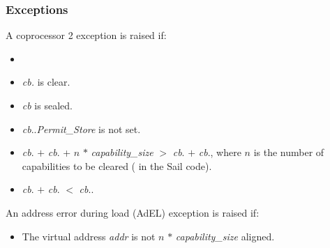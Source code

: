 
\subsubsection*{Exceptions}

A coprocessor 2 exception is raised if:

\begin{itemize}
\item
\cchecktag{}
\item
\emph{cb.\ctag{}} is clear.
\item
\emph{cb} is sealed.
\item
\emph{cb}.\cperms.\emph{Permit\_Store} is not set.
\item
\emph{cb}.\cbase{} $+$ \emph{cb}.\coffset{} + $n$ $*$ \emph{capability\_size} $>$ \emph{cb}.\cbase{} $+$ \emph{cb}.\clength{},
		where $n$ is the number of capabilities to be cleared ( in the Sail code).
\item
\emph{cb}.\cbase{} $+$ \emph{cb}.\coffset{} $<$ \emph{cb}.\cbase{}.
\end{itemize}

An address error during load (AdEL) exception is raised if:

\begin{itemize}
\item
The virtual address \emph{addr} is not $n$ $*$ \emph{capability\_size} aligned.
\end{itemize}
